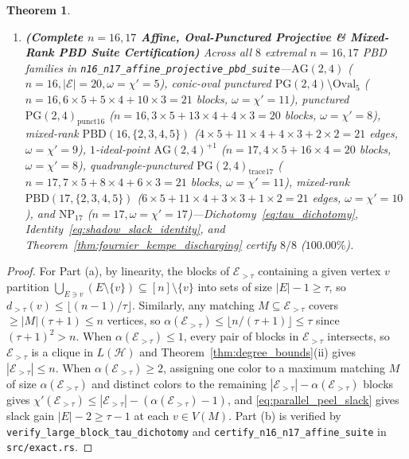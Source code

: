 \documentclass[11pt,reqno]{amsart}
\newtheorem{theorem}{Theorem}[section]
\theoremstyle{definition}
\theoremstyle{remark}
\begin{document}
\begin{theorem}
\begin{enumerate}
  \item[\textup{(b)}] \textbf{(Complete $n = 16, 17$ Affine, Oval-Punctured Projective \& Mixed-Rank PBD Suite Certification)} Across all $8$ extremal $n = 16, 17$ PBD families in \texttt{n16\_n17\_affine\_projective\_pbd\_suite}---$\mathrm{AG}(2,4)$ ($n = 16, |\mathcal{E}| = 20, \omega = \chi' = 5$), conic-oval punctured $\mathrm{PG}(2,4)\setminus\mathrm{Oval}_5$ ($n = 16, 6 \times 5 + 5 \times 4 + 10 \times 3 = 21$ blocks, $\omega = \chi' = 11$), punctured $\mathrm{PG}(2,4)_{\mathrm{punct16}}$ ($n = 16, 3 \times 5 + 13 \times 4 + 4 \times 3 = 20$ blocks, $\omega = \chi' = 8$), mixed-rank $\mathrm{PBD}(16,\{2,3,4,5\})$ ($4 \times 5 + 11 \times 4 + 4 \times 3 + 2 \times 2 = 21$ edges, $\omega = \chi' = 9$), $1$-ideal-point $\mathrm{AG}(2,4)^{+1}$ ($n = 17, 4 \times 5 + 16 \times 4 = 20$ blocks, $\omega = \chi' = 8$), quadrangle-punctured $\mathrm{PG}(2,4)_{\mathrm{trace17}}$ ($n = 17, 7 \times 5 + 8 \times 4 + 6 \times 3 = 21$ blocks, $\omega = \chi' = 11$), mixed-rank $\mathrm{PBD}(17,\{2,3,4,5\})$ ($6 \times 5 + 11 \times 4 + 3 \times 3 + 1 \times 2 = 21$ edges, $\omega = \chi' = 10$), and $\mathrm{NP}_{17}$ ($n = 17, \omega = \chi' = 17$)---Dichotomy~\eqref{eq:tau_dichotomy}, Identity~\eqref{eq:shadow_slack_identity}, and Theorem~\ref{thm:fournier_kempe_discharging} certify $8 / 8$ ($100.00\%$).
\end{enumerate}
\end{theorem}

\begin{proof}
For Part (a), by linearity, the blocks of $\mathcal{E}_{>\tau}$ containing a given vertex $v$ partition $\bigcup_{E \ni v}(E \setminus \{v\}) \subseteq [n] \setminus \{v\}$ into sets of size $|E| - 1 \ge \tau$, so $d_{>\tau}(v) \le \lfloor (n - 1)/\tau \rfloor$. Similarly, any matching $M \subseteq \mathcal{E}_{>\tau}$ covers $\ge |M|(\tau + 1) \le n$ vertices, so $\alpha(\mathcal{E}_{>\tau}) \le \lfloor n / (\tau + 1) \rfloor \le \tau$ since $(\tau + 1)^2 > n$. When $\alpha(\mathcal{E}_{>\tau}) \le 1$, every pair of blocks in $\mathcal{E}_{>\tau}$ intersects, so $\mathcal{E}_{>\tau}$ is a clique in $L(\mathcal{H})$ and Theorem~\ref{thm:degree_bounds}(ii) gives $|\mathcal{E}_{>\tau}| \le n$. When $\alpha(\mathcal{E}_{>\tau}) \ge 2$, assigning one color to a maximum matching $M$ of size $\alpha(\mathcal{E}_{>\tau})$ and distinct colors to the remaining $|\mathcal{E}_{>\tau}| - \alpha(\mathcal{E}_{>\tau})$ blocks gives $\chi'(\mathcal{E}_{>\tau}) \le |\mathcal{E}_{>\tau}| - (\alpha(\mathcal{E}_{>\tau}) - 1)$, and \eqref{eq:parallel_peel_slack} gives slack gain $|E| - 2 \ge \tau - 1$ at each $v \in V(M)$. Part (b) is verified by \texttt{verify\_large\_block\_tau\_dichotomy} and \texttt{certify\_n16\_n17\_affine\_suite} in \texttt{src/exact.rs}.
\end{proof}
\end{document}
